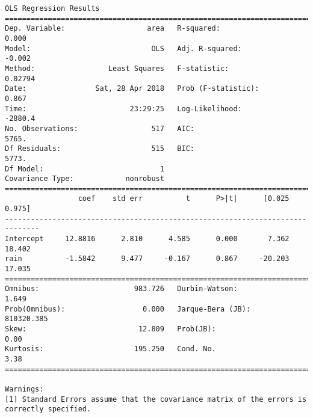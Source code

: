 \documentclass[11pt]{article}
\begin{document}
\begin{Verbatim}[commandchars=\\\{\}]
                            OLS Regression Results                            
==============================================================================
Dep. Variable:                   area   R-squared:                       0.000
Model:                            OLS   Adj. R-squared:                 -0.002
Method:                 Least Squares   F-statistic:                   0.02794
Date:                Sat, 28 Apr 2018   Prob (F-statistic):              0.867
Time:                        23:29:25   Log-Likelihood:                -2880.4
No. Observations:                 517   AIC:                             5765.
Df Residuals:                     515   BIC:                             5773.
Df Model:                           1                                         
Covariance Type:            nonrobust                                         
==============================================================================
                 coef    std err          t      P>|t|      [0.025      0.975]
------------------------------------------------------------------------------
Intercept     12.8816      2.810      4.585      0.000       7.362      18.402
rain          -1.5842      9.477     -0.167      0.867     -20.203      17.035
==============================================================================
Omnibus:                      983.726   Durbin-Watson:                   1.649
Prob(Omnibus):                  0.000   Jarque-Bera (JB):           810320.385
Skew:                          12.809   Prob(JB):                         0.00
Kurtosis:                     195.250   Cond. No.                         3.38
==============================================================================

Warnings:
[1] Standard Errors assume that the covariance matrix of the errors is correctly specified.



\end{Verbatim}
\end{document}
